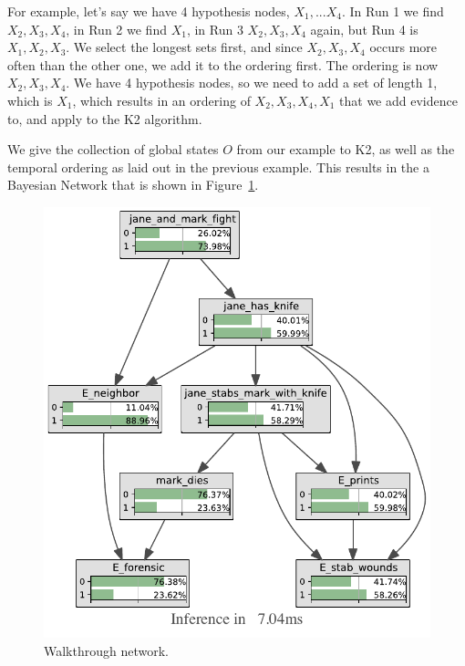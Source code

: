 For example, let's say we have 4 hypothesis nodes, $X_1,...X_4$. In Run 1 we find $X_2, X_3, X_4$, in Run 2 we find $X_1$, in Run 3 $X_2, X_3, X_4$ again, but Run 4 is $X_1, X_2, X_3$. We select the longest sets first, and since $X_2, X_3, X_4$ occurs more often than the other one, we add it to the ordering first.  The ordering is now $X_2, X_3, X_4$. We have 4 hypothesis nodes, so we need to add a set of length 1, which is $X_1$, which results in an ordering of $X_2, X_3, X_4, X_1$ that we add evidence to, and apply to the K2 algorithm.


\begin{example}
We give the collection of global states $O$ from our example to K2, as well as the temporal ordering as laid out in the previous example. This results in the a Bayesian Network that is shown in Figure~\ref{genepool}.

\begin{figure}
\includegraphics[width=\linewidth]{../experiments/WalkThrough/bnImage/BNIMAGEWalkThrough.pdf}
\caption{Walkthrough network.}
\label{genepool}
\end{figure}
\end{example}

